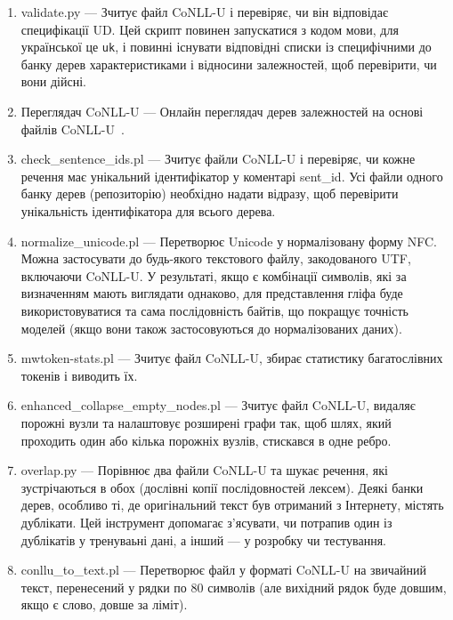 \begin{enumerate}
  \item validate.py --- Зчитує файл CoNLL-U і перевіряє, чи він відповідає
  специфікації UD. Цей скрипт повинен запускатися з кодом мови, для 
  української це \texttt{uk}, і повинні існувати відповідні списки із
  специфічними до банку дерев характеристиками і відносини залежностей, щоб 
  перевірити, чи вони дійсні.
  
  \item Переглядач CoNLL-U --- Онлайн переглядач дерев залежностей на основі
  файлів CoNLL-U~\cite{bib19}.
  
  \item check\_sentence\_ids.pl --- Зчитує файли CoNLL-U і перевіряє, чи кожне
  речення має унікальний ідентифікатор у коментарі sent\_id.
  Усі файли одного банку дерев (репозиторію) необхідно надати відразу, щоб
  перевірити унікальність ідентифікатора для всього дерева.
  
  \item normalize\_unicode.pl --- Перетворює Unicode у нормалізовану форму NFC.
  Можна застосувати до будь-якого текстового файлу, закодованого UTF,
  включаючи CoNLL-U. У результаті, якщо є комбінації символів, які за
  визначенням мають виглядати однаково, для представлення гліфа буде
  використовуватися та сама послідовність байтів, що покращує точність моделей
  (якщо вони також застосовуються до нормалізованих даних).
  
  \item mwtoken-stats.pl --- Зчитує файл CoNLL-U, збирає статистику багатослівних токенів і виводить їх.
  
  \item enhanced\_collapse\_empty\_nodes.pl --- Зчитує файл CoNLL-U, видаляє
  порожні вузли та налаштовує розширені графи так, щоб шлях, який проходить
  один або кілька порожніх вузлів, стискався в одне ребро.
  
  \item overlap.py --- Порівнює два файли CoNLL-U та шукає речення, які
  зустрічаються в обох (дослівні копії послідовностей лексем). Деякі банки
  дерев, особливо ті, де оригінальний текст був отриманий з Інтернету, містять
  дублікати. Цей інструмент допомагає з’ясувати, чи потрапив один із дублікатів
  у тренуваьні дані, а інший — у розробку чи тестування.
  
  \item conllu\_to\_text.pl --- Перетворює файл у форматі CoNLL-U на звичайний
  текст, перенесений у рядки по 80 символів 
  (але вихідний рядок буде довшим, якщо є слово, довше за ліміт).
  
\end{enumerate}

